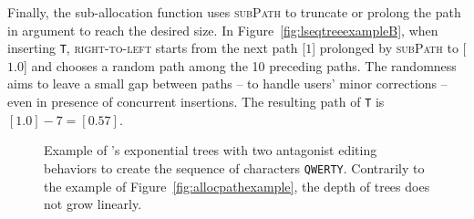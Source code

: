 Finally, the sub-allocation function uses \textsc{subPath} to truncate or
prolong the path in argument to reach the desired size. In
Figure~\ref{fig:lseqtreeexampleB}, when inserting \texttt{T},
\textsc{right-to-left} starts from the next path [$1$] prolonged by
\textsc{subPath} to [$1.0$] and chooses a random path among the 10 preceding
paths.  The randomness aims to leave a small gap between paths -- to handle
users' minor corrections -- even in presence of concurrent insertions. The
resulting path of \texttt{T} is $[1.0] - 7 = [0.57]$.



\begin{figure}
  \centering
  \caption{\label{fig:lseqtreeexample} Example of \LSEQ's exponential trees with
    two antagonist editing behaviors to create the sequence of characters
    \texttt{QWERTY}. Contrarily to the example of
    Figure~\ref{fig:allocpathexample}, the depth of trees does not grow
    linearly.}
\end{figure}


